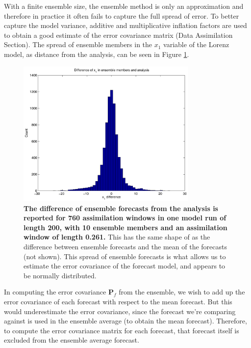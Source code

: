\documentclass[10pt,letterpaper]{article}
\newcommand{\mbP}{\mathbf{P}}
\begin{document}
With a finite ensemble size, the ensemble method is only an approximation and therefore in practice it often fails to capture the full spread of error.
To better capture the model variance, additive and multiplicative inflation factors are used to obtain a good estimate of the error covariance matrix (Data Assimilation Section).
The spread of ensemble members in the $x_1$ variable of the Lorenz model, as distance from the analysis, can be seen in Figure \ref{fig:EnKFhist}.

\begin{figure}[h]
  \centering
  \includegraphics[width=0.79\textwidth]{fig15_EnKF-histogram-analysis.pdf}
  \caption[The difference of ensemble forecasts from the analysis is reported for 760 assimilation windows in one model run of length 200, with 10 ensemble members and an assimilation window of length 0.261]{
\textbf{    The difference of ensemble forecasts from the analysis is reported for 760 assimilation windows in one model run of length 200, with 10 ensemble members and an assimilation window of length 0.261.
}    This has the same shape of as the difference between ensemble forecasts and the mean of the forecasts (not shown).
    This spread of ensemble forecasts is what allows us to estimate the error covariance of the forecast model, and appears to be normally distributed.
  }
  \label{fig:EnKFhist}
\end{figure}

In computing the error covariance $\mbP_f$ from the ensemble, we wish to add up the error covariance of each forecast with respect to the mean forecast. 
But this would underestimate the error covariance, since the forecast we're comparing against is used in the ensemble average (to obtain the mean forecast).
Therefore, to compute the error covariance matrix for each forecast, that forecast itself is excluded from the ensemble average forecast.
\end{document}
